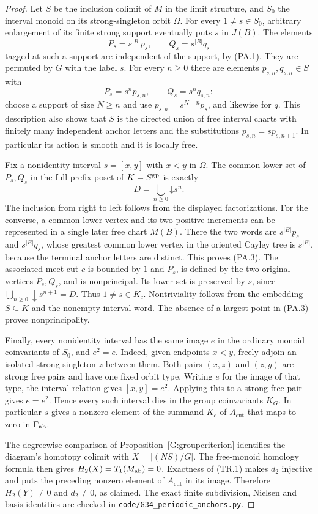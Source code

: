 \begin{proof}
Let $S$ be the inclusion colimit of $M$ in the limit structure,
and $S_0$ the interval monoid on its strong-singleton orbit
$\Omega$. For every $1\ne s\in S_0$, arbitrary enlargement
of its finite strong support eventually puts $s$ in $J(B)$.
The elements
\[
 P_s=s^{|B|}p_s,\qquad Q_s=s^{|B|}q_s
\]
tagged at such a support are independent of the support, by
(PA.1). They are permuted by $G$ with the label $s$.
For every $n\ge0$ there are elements $p_{s,n},q_{s,n}\in S$
with
\[
 P_s=s^n p_{s,n},\qquad Q_s=s^n q_{s,n}:
\]
choose a support of size $N\ge n$ and use
$p_{s,n}=s^{N-n}p_s$, and likewise for $q$.
This description also shows that $S$ is the directed union of
free interval charts with finitely many independent anchor
letters and the substitutions $p_{s,n}=s p_{s,n+1}$.
In particular its action is smooth and it is locally free.

Fix a nonidentity interval $s=[x,y]$ with $x<y$ in $\Omega$.
The common lower set of $P_s,Q_s$ in the full prefix poset of
$K=S^{\mathrm{gp}}$ is exactly
\[
 D=\bigcup_{n\ge0}\mathord\downarrow s^n.
 \tag{PA.3}
\]
The inclusion from right to left follows from the displayed
factorizations. For the converse, a common lower vertex and
its two positive increments can be represented in a single
later free chart $M(B)$. There the two words are
$s^{|B|}p_s$ and $s^{|B|}q_s$, whose greatest common lower
vertex in the oriented Cayley tree is $s^{|B|}$, because the
terminal anchor letters are distinct. This proves (PA.3).
The associated meet cut $c$ is bounded by $1$ and $P_s$,
is defined by the two original vertices $P_s,Q_s$, and is
nonprincipal. Its lower set is preserved by $s$, since
$\bigcup_{n\ge0}\downarrow s^{n+1}=D$. Thus $1\ne s\in K_c$.
Nontriviality follows from the embedding $S\subseteq K$ and
the nonempty interval word. The absence of a largest point
in (PA.3) proves nonprincipality.

Finally, every nonidentity interval has the same image $e$
in the ordinary monoid coinvariants of $S_0$, and $e^2=e$.
Indeed, given endpoints $x<y$, freely adjoin an isolated strong
singleton $z$ between them. Both pairs $(x,z)$ and $(z,y)$
are strong free pairs and have one fixed orbit type. Writing
$e$ for the image of that type, the interval relation gives
$[x,y]=e^2$. Applying this to a strong free pair gives
$e=e^2$. Hence every such interval dies in the group
coinvariants $K_G$. In particular $s$ gives a nonzero element
of the summand $K_c$ of $A_{\mathrm{cut}}$ that maps to zero
in $\Gamma_{\mathrm{ab}}$.

The degreewise comparison of Proposition~\ref{G:groupcriterion}
identifies the diagram's homotopy colimit with $X=|(NS)/G|$.
The free-monoid homology formula then gives $H_2(X)=T_1(M_{\mathrm{ab}})=0$.
Exactness of (TR.1) makes $d_2$ injective and puts the preceding
nonzero element of $A_{\mathrm{cut}}$ in its image. Therefore
$H_2(Y)\ne0$ and $d_2\ne0$, as claimed. The exact finite
subdivision, Nielsen and basis identities are checked in
\texttt{code/G34\_periodic\_anchors.py}.
\end{proof}


